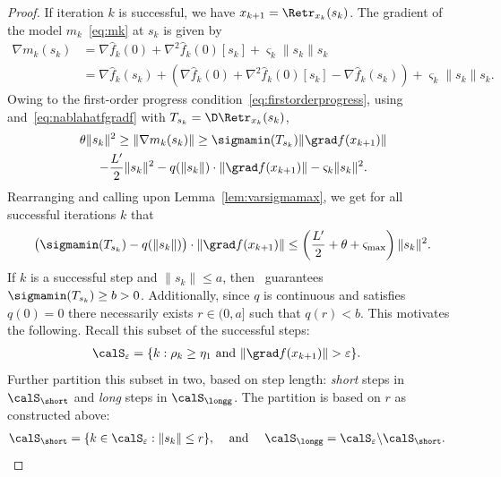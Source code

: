 \begin{proof}
	If iteration $k$ is successful, we have $x_{k+1} = \Retr_{x_k}(s_k)$.
	The gradient of the model $m_k$~\eqref{eq:mk} at $s_k$ is given by
	\begin{align*}
		\nabla m_k(s_k) & = \nabla \hat f_k(0) + \nabla^2 \hat f_k(0)[s_k] + \varsigma_k \|s_k\| s_k \\
						& = \nabla \hat f_k(s_k) + \left( \nabla \hat f_k(0) + \nabla^2 \hat f_k(0)[s_k] - \nabla \hat f_k(s_k) \right) + \varsigma_k \|s_k\| s_k.
	\end{align*}
	Owing to the first-order progress condition~\eqref{eq:firstorderprogress}, using~ and~\eqref{eq:nablahatfgradf} with $T_{s_k} = \D\Retr_{x_k}(s_k)$,
	\begin{multline*}
		\theta \|s_k\|^2 \geq \|\nabla m_k(s_k)\| \geq \sigmamin(T_{s_k}) \|\grad f(x_{k+1})\| \\ - \frac{L'}{2} \|s_k\|^2 - q(\|s_k\|) \cdot \|\grad f(x_{k+1})\| - \varsigma_k \|s_k\|^2.
	\end{multline*}
	Rearranging and calling upon Lemma~\ref{lem:varsigmamax}, we get for all successful iterations $k$ that
	\begin{align}
		\big( \sigmamin(T_{s_k}) - q(\|s_k\|) \big) \cdot \|\grad f(x_{k+1})\| \leq \left(\frac{L'}{2} + \theta + \varsigma_{\max}\right) \|s_k\|^2.
	\label{eq:ineqgradnormxkplus}
	\end{align}	
	If $k$ is a successful step and $\|s_k\| \leq a$, then~ guarantees $\sigmamin(T_{s_k}) \geq b > 0$. Additionally, since $q$ is continuous and satisfies $q(0) = 0$ there necessarily exists $r \in (0, a]$ such that $q(r) < b$. This motivates the following. Recall this subset of the successful steps: %
	\begin{align*}
	\calS_\varepsilon & = \{ k : \rho_k \geq \eta_1 \textrm{ and } \|\grad f(x_{k+1})\| > \varepsilon \}.
	\end{align*}
	Further partition this subset in two, based on step length: \emph{short} steps in $\calS_\short$ and \emph{long} steps in $\calS_\longg$. The partition is based on $r$ as constructed above:
	\begin{align*}
	\calS_\short & = \{ k \in \calS_\varepsilon : \|s_k\| \leq r \}, & \textrm{ and } &  & \calS_\longg & = \calS_\varepsilon \backslash \calS_\short.
	\end{align*}
	

\end{proof}
